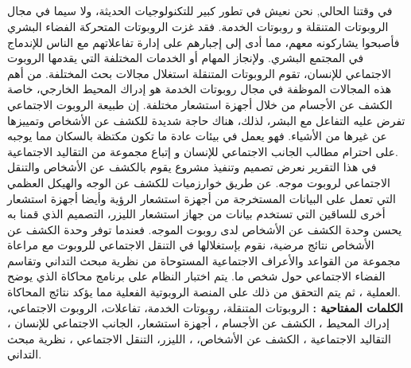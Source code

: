 


\begin{otherlanguage}{arabic}

\chapter*{ }
\label{Chapter4} 
\tab في وقتنا الحالي, نحن نعيش في تطور كبير للتكنولوجيات الحديثة، ولا سيما في مجال الروبوتات المتنقلة و روبوتات الخدمة. فقد غزت الروبوتات المتحركة الفضاء البشري فأصبحوا يشاركونه معهم، مما أدى إلى إجبارهم على إدارة تفاعلاتهم مع الناس  للإندماج في المجتمع البشري. ولإنجاز المهام أو الخدمات المختلفة التي يقدمها الروبوت الاجتماعي للإنسان، تقوم الروبوتات المتنقلة استغلال مجالات بحث المختلفة. من أهم هذه المجالات الموظفة في مجال روبوتات الخدمة هو إدراك المحيط الخارجي،  خاصة الكشف عن الأجسام من خلال أجهزة استشعار مختلفة. إن طبيعة الروبوت الاجتماعي تفرض عليه التفاعل مع البشر، لذلك، هناك حاجة شديدة للكشف عن الأشخاص وتمييزها عن غيرها من الأشياء. فهو يعمل في بيئات  عادة ما تكون مكتظة بالسكان مما يوجبه على احترام مطالب الجانب الاجتماعي للإنسان و إتباع مجموعة من التقاليد الاجتماعية.\vspace{5px}\\
\tab في هذا التقرير نعرض تصميم وتنفيذ مشروع  يقوم بالكشف عن الأشخاص والتنقل الاجتماعي لروبوت موجه. عن طريق خوارزميات للكشف عن الوجه والهيكل العظمي التي تعمل على البيانات المستخرجة من أجهزة استشعار الرؤية  وأيضا أجهزة استشعار أخرى للساقين التي تستخدم بيانات من جهاز استشعار الليزر، التصميم الذي قمنا به يحسن وحدة الكشف عن الأشخاص لدى روبوت الموجه. فعندما توفر وحدة الكشف عن الأشخاص نتائج مرضية، نقوم  بإستغلالها في التنقل الاجتماعي للروبوت مع مراعاة مجموعة من القواعد والأعراف الاجتماعية المستوحاة من نظرية مبحث التداني وتقاسم الفضاء الاجتماعي حول شخص ما. يتم اختبار النظام على برنامج محاكاة الذي يوضح العملية ، ثم يتم التحقق من ذلك على المنصة الروبوتية الفعلية مما يؤكد نتائج المحاكاة.\vspace{5px}\\
\tab \textbf{الكلمات المفتاحية : }الروبوتات المتنقلة، روبوتات الخدمة، تفاعلات، الروبوت الاجتماعي، إدراك المحيط ، الكشف عن الأجسام ، أجهزة استشعار، الجانب الاجتماعي للإنسان ، التقاليد الاجتماعية ، الكشف عن الأشخاص،  ، الليزر، التنقل الاجتماعي ،  نظرية مبحث التداني.
	
\end{otherlanguage}